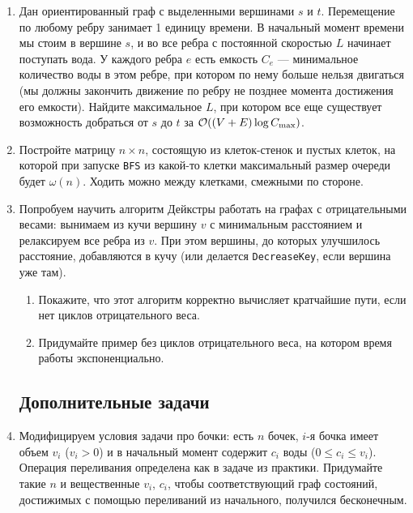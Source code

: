 \begin{enumerate}
  \item
    Дан ориентированный граф с выделенными вершинами $s$ и $t$. Перемещение по любому ребру занимает 1 единицу времени.
    В начальный момент времени мы стоим в вершине $s$, и во все ребра с постоянной скоростью $L$ начинает поступать вода.
    У каждого ребра $e$ есть емкость $C_e$ --- минимальное количество воды в этом ребре, при котором по нему больше
    нельзя двигаться (мы должны закончить движение по ребру не позднее момента достижения его емкости). Найдите
    максимальное $L$, при котором все еще существует возможность добраться от $s$ до $t$ за $\mathcal{O}((V + E)\log{C_{\max}})$.

  \item
    Постройте матрицу $n \times n$, состоящую из клеток-стенок и пустых клеток,
    на которой при запуске \texttt{BFS} из какой-то клетки максимальный
    размер очереди будет $\omega(n)$. Ходить можно между клетками, смежными по стороне.

  \item
    Попробуем научить алгоритм Дейкстры работать на графах с отрицательными весами: вынимаем из кучи вершину $v$
    с минимальным расстоянием и релаксируем все ребра из $v$. При этом вершины, до которых улучшилось расстояние,
    добавляются в кучу (или делается \texttt{DecreaseKey}, если вершина уже там).
    \begin{enumerate}
      \item Покажите, что этот алгоритм корректно вычисляет кратчайшие пути, если нет циклов отрицательного веса.
      \item Придумайте пример без циклов отрицательного веса, на котором время работы экспоненциально.
    \end{enumerate}

\subsection*{Дополнительные задачи}

  \item
    Модифицируем условия задачи про бочки: есть $n$ бочек, $i$-я бочка имеет
    объем $v_i$ ($v_i > 0$) и в начальный момент содержит $c_i$ воды
    ($0 \le c_i \le v_i$). Операция переливания определена как в задаче из практики.
    Придумайте такие $n$ и вещественные $v_i$, $c_i$, чтобы соответствующий граф
    состояний, достижимых с помощью переливаний из начального, получился бесконечным.  

\end{enumerate}
